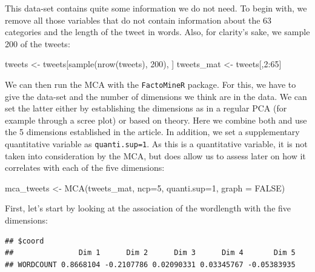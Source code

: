 \documentclass[
]{book}
\newenvironment{Shaded}{\begin{snugshade}}{\end{snugshade}}
\newcommand{\AttributeTok}[1]{\textcolor[rgb]{0.77,0.63,0.00}{#1}}
\newcommand{\ConstantTok}[1]{\textcolor[rgb]{0.00,0.00,0.00}{#1}}
\newcommand{\DecValTok}[1]{\textcolor[rgb]{0.00,0.00,0.81}{#1}}
\newcommand{\FunctionTok}[1]{\textcolor[rgb]{0.00,0.00,0.00}{#1}}
\newcommand{\NormalTok}[1]{#1}
\newcommand{\OtherTok}[1]{\textcolor[rgb]{0.56,0.35,0.01}{#1}}
\newcommand{\SpecialCharTok}[1]{\textcolor[rgb]{0.00,0.00,0.00}{#1}}
\begin{document}
This data-set contains quite some information we do not need. To begin with, we remove all those variables that do not contain information about the 63 categories and the length of the tweet in words. Also, for clarity's sake, we sample 200 of the tweets:

\begin{Shaded}
\begin{Highlighting}[]
\NormalTok{tweets }\OtherTok{\textless{}{-}}\NormalTok{ tweets[}\FunctionTok{sample}\NormalTok{(}\FunctionTok{nrow}\NormalTok{(tweets), }\DecValTok{200}\NormalTok{), ]}
\NormalTok{tweets\_mat }\OtherTok{\textless{}{-}}\NormalTok{ tweets[,}\DecValTok{2}\SpecialCharTok{:}\DecValTok{65}\NormalTok{]}
\end{Highlighting}
\end{Shaded}

We can then run the MCA with the \texttt{FactoMineR} package. For this, we have to give the data-set and the number of dimensions we think are in the data. We can set the latter either by establishing the dimensions as in a regular PCA (for example through a scree plot) or based on theory. Here we combine both and use the 5 dimensions established in the article. In addition, we set a supplementary quantitative variable as \texttt{quanti.sup=1}. As this is a quantitative variable, it is not taken into consideration by the MCA, but does allow us to assess later on how it correlates with each of the five dimensions:

\begin{Shaded}
\begin{Highlighting}[]
\NormalTok{mca\_tweets }\OtherTok{\textless{}{-}} \FunctionTok{MCA}\NormalTok{(tweets\_mat, }\AttributeTok{ncp=}\DecValTok{5}\NormalTok{, }\AttributeTok{quanti.sup=}\DecValTok{1}\NormalTok{, }\AttributeTok{graph =} \ConstantTok{FALSE}\NormalTok{)}
\end{Highlighting}
\end{Shaded}

First, let's start by looking at the association of the wordlength with the five dimensions:

\begin{Shaded}
\end{Shaded}

\begin{verbatim}
## $coord
##               Dim 1      Dim 2      Dim 3      Dim 4       Dim 5
## WORDCOUNT 0.8668104 -0.2107786 0.02090331 0.03345767 -0.05383935
\end{verbatim}
\end{document}
